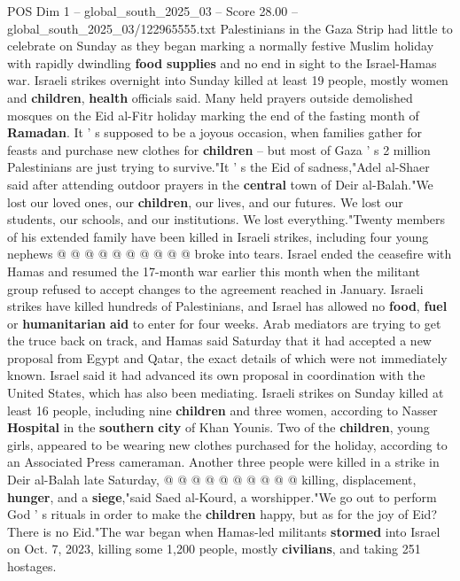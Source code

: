 \begin{textsample}{POS Dim 1 – global\_south\_2025\_03 – Score 28.00 – global\_south\_2025\_03/122965555.txt}  \label{ex:f1_pos_263}
Palestinians in the Gaza Strip had little to celebrate on Sunday as they began marking a normally festive Muslim holiday with rapidly dwindling \textbf{food} \textbf{supplies} and no end in sight to the Israel-Hamas war.
Israeli strikes overnight into Sunday killed at least 19 people, mostly women and \textbf{children}, \textbf{health} officials said.
Many held prayers outside demolished mosques on the Eid al-Fitr holiday marking the end of the fasting month of \textbf{Ramadan}.
It ' s supposed to be a joyous occasion, when families gather for feasts and purchase new clothes for \textbf{children} -- but most of Gaza ' s 2 million Palestinians are just trying to survive."It ' s the Eid of sadness,"Adel al-Shaer said after attending outdoor prayers in the \textbf{central} town of Deir al-Balah."We lost our loved ones, our \textbf{children}, our lives, and our futures.
We lost our students, our schools, and our institutions.
We lost everything."Twenty members of his extended family have been killed in Israeli strikes, including four young nephews @ @ @ @ @ @ @ @ @ @ broke into tears.
Israel ended the ceasefire with Hamas and resumed the 17-month war earlier this month when the militant group refused to accept changes to the agreement reached in January.
Israeli strikes have killed hundreds of Palestinians, and Israel has allowed no \textbf{food}, \textbf{fuel} or \textbf{humanitarian} \textbf{aid} to enter for four weeks.
Arab mediators are trying to get the truce back on track, and Hamas said Saturday that it had accepted a new proposal from Egypt and Qatar, the exact details of which were not immediately known.
Israel said it had advanced its own proposal in coordination with the United States, which has also been mediating.
Israeli strikes on Sunday killed at least 16 people, including nine \textbf{children} and three women, according to Nasser \textbf{Hospital} in the \textbf{southern} \textbf{city} of Khan Younis.
Two of the \textbf{children}, young girls, appeared to be wearing new clothes purchased for the holiday, according to an Associated Press cameraman.
Another three people were killed in a strike in Deir al-Balah late Saturday, @ @ @ @ @ @ @ @ @ @ killing, displacement, \textbf{hunger}, and a \textbf{siege},"said Saed al-Kourd, a worshipper."We go out to perform God ' s rituals in order to make the \textbf{children} happy, but as for the joy of Eid?
There is no Eid."The war began when Hamas-led militants \textbf{stormed} into Israel on Oct. 7, 2023, killing some 1,200 people, mostly \textbf{civilians}, and taking 251 hostages.

\end{textsample}
